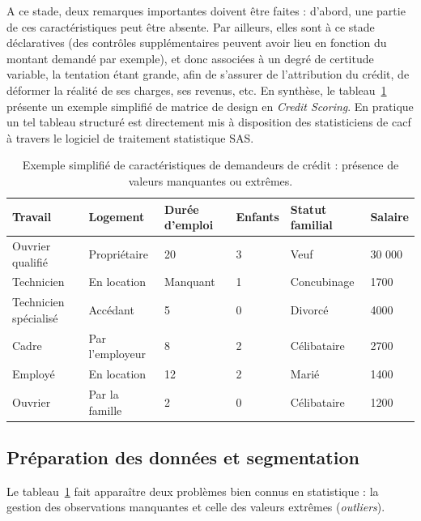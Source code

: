 A ce stade, deux remarques importantes doivent être faites : d'abord, 
une partie de ces caractéristiques peut être absente. Par ailleurs, 
elles sont à ce stade déclaratives (des contrôles supplémentaires peuvent avoir lieu en fonction du montant demandé par exemple), et donc associées à un degré de certitude variable, la tentation étant grande, afin de s'assurer de l'attribution du crédit, de déformer la réalité de ses charges, ses revenus, etc. En synthèse, le tableau~\ref{tab:design} présente un exemple simplifié de matrice de design en \textit{Credit Scoring}. En pratique un tel tableau structuré est directement mis à disposition des statisticiens de \gls{cacf} à travers le logiciel de traitement statistique SAS.


\begin{table}
\centering
\caption{\label{tab:design} Exemple simplifié de caractéristiques de demandeurs de crédit : présence de valeurs manquantes ou extrêmes.}
\begin{tabular}{l|l|l|l|l|l}
Travail & Logement & Durée d'emploi & Enfants & Statut familial & Salaire \\
\hline
Ouvrier qualifié & Propriétaire & 20 & 3 & Veuf & 30 000  \\
Technicien & En location & Manquant & 1 & Concubinage & {1700}  \\
Technicien spécialisé & Accédant & 5 & 0 & Divorcé & {4000}  \\
Cadre & Par l'employeur & 8 & 2 & Célibataire & {2700}  \\
Employé & En location & 12 & 2 & Marié & {1400}  \\
Ouvrier & Par la famille & 2 & 0 & Célibataire & {1200}  \\
\end{tabular}
\end{table}

\subsection{Préparation des données et segmentation} \label{subsec:segmentation}

Le tableau~\ref{tab:design} fait apparaître deux problèmes bien connus en statistique : la gestion des observations manquantes et celle des valeurs extrêmes (\textit{outliers}).

